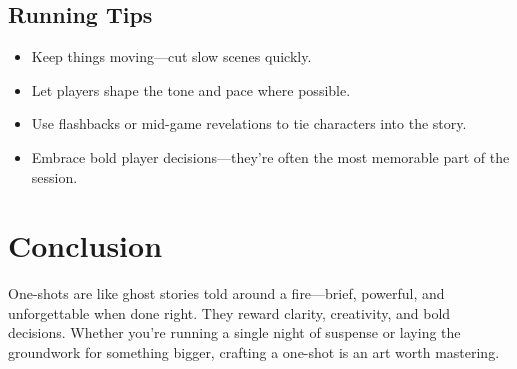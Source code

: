 \subsection*{Running Tips}
\begin{itemize}
    \item Keep things moving—cut slow scenes quickly.
    \item Let players shape the tone and pace where possible.
    \item Use flashbacks or mid-game revelations to tie characters into the story.
    \item Embrace bold player decisions—they’re often the most memorable part of the session.
\end{itemize}


\section{Conclusion}

One-shots are like ghost stories told around a fire—brief, powerful, and unforgettable when done right. They reward clarity, creativity, and bold decisions. Whether you’re running a single night of suspense or laying the groundwork for something bigger, crafting a one-shot is an art worth mastering.